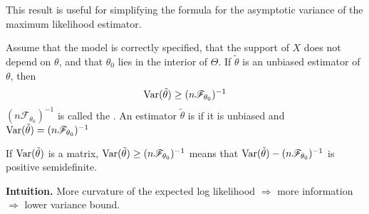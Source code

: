 \documentclass[10pt]{article}
\begin{document}
\begin{remark}
	This result is useful for simplifying the formula for the asymptotic variance of the maximum likelihood estimator.
\end{remark}

\begin{theorem}
	Assume that the model is correctly specified, that the support of $X$ does not depend on $\theta$, and that $\theta_0$ lies in the interior of $\Theta$. If $\tilde{\theta}$ is an unbiased estimator of $\theta$, then
	\[
	\mathop{\rm Var}(\tilde{\theta}) \ge (n \mathscr{F}_{\theta_0})^{-1}
	\]
	$(n \mathscr{F}_{\theta_0})^{-1}$ is called the . An estimator $\tilde{\theta}$ is  if it is unbiased and $\mathop{\rm Var}(\tilde{\theta}) = (n \mathscr{F}_{\theta_0})^{-1}$
\end{theorem}

\begin{remark}
	If $\mathop{\rm Var}(\tilde{\theta})$ is a matrix, $\mathop{\rm Var}(\tilde{\theta}) \ge (n \mathscr{F}_{\theta_0})^{-1}$ means that $\mathop{\rm Var}(\tilde{\theta}) - (n \mathscr{F}_{\theta_0})^{-1}$ is positive semidefinite.
	
	\textbf{Intuition.} More curvature of the expected log likelihood $\Longrightarrow$ more information $\Longrightarrow$ lower variance bound.
\end{remark}
\end{document}
